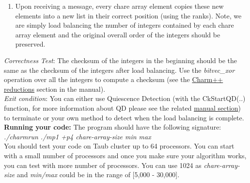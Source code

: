 \documentclass{article}
\begin{document}
\begin{enumerate}

\item Upon receiving a message, every chare array element copies these new
elements into a new list in their correct position (using the ranks).
Note, we are simply load balancing the number of integers contained by each chare array element
and the original overall order of the integers should be preserved.
 
\end{enumerate}

\emph{Correctness Test}: The checksum of the integers in the beginning
should be the same as the checksum of the integers after load balancing.
Use the \emph{bitvec\_xor} operation over all the integers to compute a checksum (see the \href{http://charm.cs.uiuc.edu/manuals/html/charm++/4.html#SECTION01361000000000000000}{ Charm++
reductions} section in the manual). \\

\emph{Exit condition}: You can either use Quiescence Detection (with the CkStartQD(..) function, for more
information about QD please see the related
\href{http://charm.cs.illinois.edu/manuals/html/charm++/12.html#SECTION02350000000000000000}{manual
section}) to terminate or your own method to detect when
the load balancing is complete. \\


\textbf{Running your code:}
The program should have the following signature: \\
\textit{./charmrun ./mp1 +p4 chare-array-size min max} \\

You should test your code on Taub cluster up to 64 processors. You can start with a small
number of processors and once you make sure your algorithm works, you can test
with more number of processors. You can use 1024 as
\textit{chare-array-size} and \textit{min/max} could be in the range of [5,000 - 30,000].
\\ \\ \\
\end{document}
